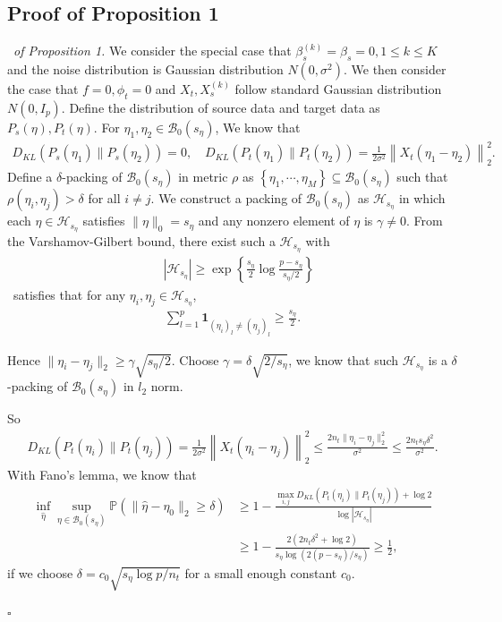 \documentclass[12pt]{article}
\newenvironment{pf}{{\noindent \it Proof}\ }{\hfill $\square$\par}
\begin{document}
\subsection{Proof of Proposition 1}
\begin{pf}{\it of Proposition 1. }
     We consider the special case that $\beta_s^{(k)} = \beta_s = 0,1\le k \le K$ and the noise distribution is Gaussian distribution $N(0,\sigma^2)$. We then consider the case that $f=0,\phi_t = 0$ and $X_t,X_s^{(k
     )}$ follow standard Gaussian distribution $N(0,I_p)$. Define the distribution of source data and target data as $P_s(\eta),P_t(\eta)$. For $\eta_1,\eta_2\in \mathcal{B}_0(s_\eta)$, We know that
    \begin{align*}
        D_{KL}\left(P_s(\eta_1)\|P_s(\eta_2)\right) = 0,\quad 
        D_{KL}\left(P_t(\eta_1)\|P_t(\eta_2)\right) = \frac{1}{2\sigma^2} \left\|X_t\left(\eta_1 - \eta_2\right)\right\|_2^2. 
    \end{align*}
    Define a $\delta$-packing of $\mathcal{B}_0(s_\eta)$ in metric $\rho$ as $\left\{\eta_1,\cdots,\eta_M\right\}\subseteq \mathcal{B}_0(s_\eta)$ such that $\rho(\eta_i,\eta_j) >\delta$ for all $i\not= j$. We construct a packing of $\mathcal{B}_0(s_\eta)$ as $\mathcal{H}_{s_\eta}$ in which each $\eta\in \mathcal{H}_{s_\eta}$ satisfies $\|\eta\|_0 = s_\eta$ and any nonzero element of $\eta$ is $\gamma \not = 0$. From the Varshamov-Gilbert bound, there exist such a $\mathcal{H}_{s_\eta}$ with 
    \begin{align*}
        \quad \left|\mathcal{H}_{s_\eta}\right| \ge \exp\left\{\frac{s_\eta}{2}\log \frac{p - s_\eta}{s_\eta/2}\right\}
    \end{align*}\
    satisfies that for any $\eta_i,\eta_j\in \mathcal{H}_{s_\eta}$,
    \begin{align*}
        \sum_{l=1}^p \mathbf{1}_{(\eta_i)_l \not = (\eta_j)_l} \ge \frac{s_\eta}{2}.
    \end{align*}
    
    Hence $\|\eta_i-\eta_j\|_2 \ge \gamma \sqrt{s_\eta/2}$. Choose $\gamma = \delta\sqrt{2/s_\eta}$, we know that such $\mathcal{H}_{s_\eta}$ is a $\delta$-packing of $\mathcal{B}_0(s_\eta)$ in $l_2$ norm. 
    
    So
    \begin{align*}
        D_{KL}\left(P_t(\eta_i)\|P_t(\eta_j)\right) = \frac{1}{2\sigma^2} \left\|X_t\left(\eta_i - \eta_j\right)\right\|_2^2\le\frac{2 n_t \|\eta_i-\eta_j\|_2^2}{\sigma^2} \le\frac{2 n_t s_\eta\delta^2}{\sigma^2}.
    \end{align*}
    With Fano's lemma, we know that 
    \begin{align*}
        \inf_{\hat{\eta}} \sup_{\eta \in \mathcal{B}_0(s_\eta)} \mathbb{P}\left(\|\hat{\eta} - \eta_0\|_2 \ge \delta\right) & \ge 1- \frac{\max_{i,j}D_{KL}\left(P_t(\eta_i)\|P_t(\eta_j)\right) +\log 2}{\log \left|\mathcal{H}_{s_\eta}\right|}\\ &\ge
        1- \frac{2(2n_t \delta^2 +\log 2)}{s_\eta \log (2(p-s_\eta)/s_\eta)} \ge \frac{1}{2},
    \end{align*}
    if we choose $\delta = c_0\sqrt{s_\eta \log p/n_t}$ for a small enough constant $c_0$. 
    

\end{pf}
\end{document}
